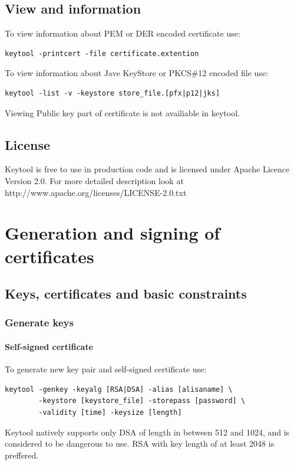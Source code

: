 \documentclass[10pt, a4paper]{report}
\begin{document}
  \subsection{View and information}
To view information about PEM or DER encoded certificate use:
\begin{verbatim}
keytool -printcert -file certificate.extention
\end{verbatim}

To view information about Jave KeyStore or PKCS\#12 encoded file use:
\begin{verbatim}
keytool -list -v -keystore store_file.[pfx|p12|jks]
\end{verbatim}

Viewing Public key part of certificate is not availiable in keytool.
  \subsection{License}
Keytool is free to use in production code and is licensed under Apache Licence Version 2.0. For more detailed description look at http://www.apache.org/licenses/LICENSE-2.0.txt
  
\section{Generation and signing of certificates}

  \subsection{Keys, certificates and basic constraints}
  
    \subsubsection{Generate keys}
    
      \paragraph{Self-signed certificate}
To generate new key pair and self-signed certificate use:
\begin{verbatim}
keytool -genkey -keyalg [RSA|DSA] -alias [alisaname] \
        -keystore [keystore_file] -storepass [password] \
        -validity [time] -keysize [length]
\end{verbatim}

Keytool natively supports only DSA of length in between 512 and 1024, and is considered to be dangerous to use. RSA with key length of at least 2048 is preffered.
\end{document}
